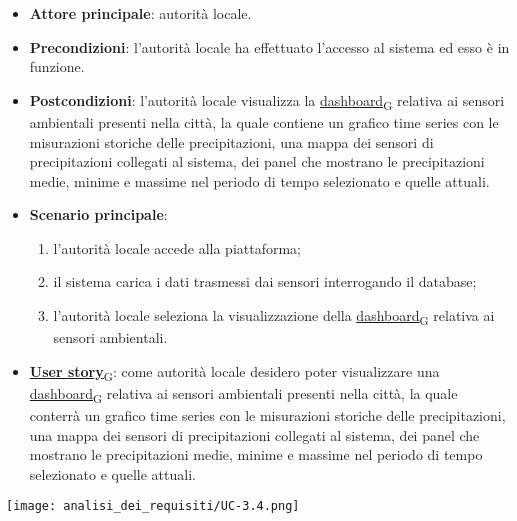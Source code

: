 \newpage
{}
\begin{itemize}
	\item \textbf{Attore principale}: autorità locale.
	\item \textbf{Precondizioni}: l'autorità locale ha effettuato l'accesso al sistema ed esso è in funzione.
	\item \textbf{Postcondizioni}: l'autorità locale visualizza la \href{https://7last.github.io/docs/pb/documentazione-interna/glossario\#dashboard}{dashboard\textsubscript{G}} relativa ai sensori ambientali presenti nella città, la quale contiene un grafico time series con le misurazioni storiche delle precipitazioni, una mappa dei sensori di precipitazioni collegati al sistema, dei panel che mostrano le precipitazioni medie, minime e massime nel periodo di tempo selezionato e quelle attuali.
	\item \textbf{Scenario principale}:
	      \begin{enumerate}
		      \item l'autorità locale accede alla piattaforma;
		      \item il sistema carica i dati trasmessi dai sensori interrogando il database;
		      \item l'autorità locale seleziona la visualizzazione della \href{https://7last.github.io/docs/pb/documentazione-interna/glossario\#dashboard}{dashboard\textsubscript{G}} relativa ai sensori ambientali.
	      \end{enumerate}
	\item \href{https://7last.github.io/docs/pb/documentazione-interna/glossario\#user-story}{\textbf{User story}\textsubscript{G}}:
	      come autorità locale desidero poter visualizzare una \href{https://7last.github.io/docs/pb/documentazione-interna/glossario\#dashboard}{dashboard\textsubscript{G}} relativa ai sensori ambientali presenti nella città, la quale conterrà un grafico time series con le misurazioni storiche delle precipitazioni, una mappa dei sensori di precipitazioni collegati al sistema, dei panel che mostrano le precipitazioni medie, minime e massime nel periodo di tempo selezionato e quelle attuali.
\end{itemize}
\begin{center}
	\texttt{[image: analisi\_dei\_requisiti/UC-3.4.png]}
\end{center}

